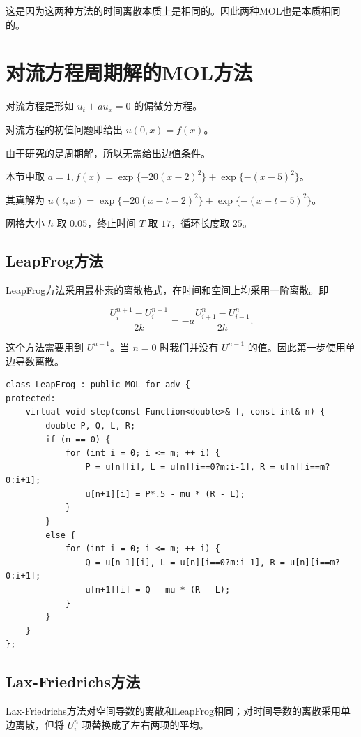 \documentclass{ctexart}
\begin{document}
这是因为这两种方法的时间离散本质上是相同的。因此两种MOL也是本质相同的。

\section{对流方程周期解的MOL方法}

对流方程是形如 $u_t+au_x=0$ 的偏微分方程。

对流方程的初值问题即给出 $u(0,x)=f(x)$。

由于研究的是周期解，所以无需给出边值条件。

本节中取 $a=1,f(x) = \exp\{-20(x-2)^2\} + \exp\{-(x-5)^2\}$。

其真解为 $u(t,x) = \exp\{-20(x-t-2)^2\} + \exp\{-(x-t-5)^2\}$。

网格大小 $h$ 取 $0.05$，终止时间 $T$ 取 $17$，循环长度取 $25$。

\subsection{LeapFrog方法}

LeapFrog方法采用最朴素的离散格式，在时间和空间上均采用一阶离散。即

\begin{equation}
	\dfrac {U^{n+1}_i-U^{n-1}_i}{2k} = -a\dfrac {U^n_{i+1} - U^n_{i-1}}{2h}.
\end{equation}

这个方法需要用到 $U^{n-1}$。当 $n=0$ 时我们并没有 $U^{n-1}$ 的值。因此第一步使用单边导数离散。

\begin{lstlisting}
class LeapFrog : public MOL_for_adv {
protected:
	virtual void step(const Function<double>& f, const int& n) {
		double P, Q, L, R;
		if (n == 0) {
			for (int i = 0; i <= m; ++ i) {
				P = u[n][i], L = u[n][i==0?m:i-1], R = u[n][i==m?0:i+1];
				u[n+1][i] = P*.5 - mu * (R - L);
			}
		}
		else {
			for (int i = 0; i <= m; ++ i) {
				Q = u[n-1][i], L = u[n][i==0?m:i-1], R = u[n][i==m?0:i+1];
				u[n+1][i] = Q - mu * (R - L);
			}
		}
	}
};
\end{lstlisting}

\subsection{Lax-Friedrichs方法}

Lax-Friedrichs方法对空间导数的离散和LeapFrog相同；对时间导数的离散采用单边离散，但将 $U^n_i$ 项替换成了左右两项的平均。
\end{document}
